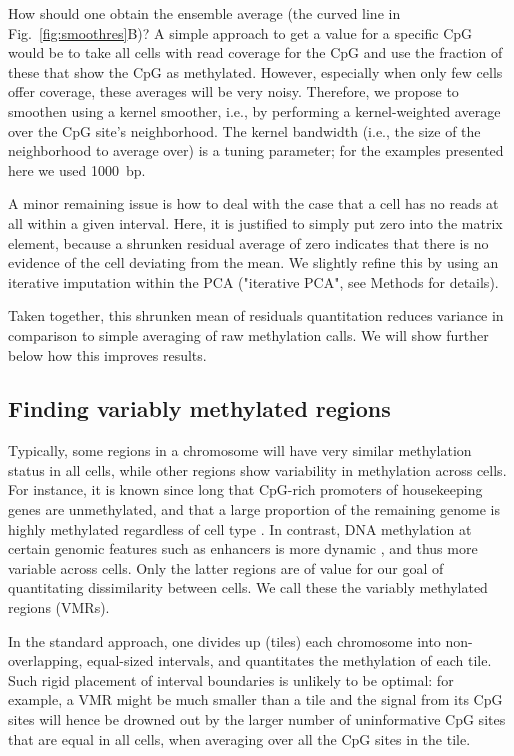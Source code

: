\documentclass[10pt]{article}
\begin{document}
How should one obtain the ensemble average (the curved line in Fig.~\ref{fig:smoothres}B)?
A simple approach to get a value for a specific CpG would be to take all cells with read coverage for the CpG and use the fraction of these that show the CpG as methylated.
However, especially when only few cells offer coverage, these averages will be very noisy.
Therefore, we propose to smoothen using a kernel smoother, i.e., by performing a kernel-weighted average over the CpG site's neighborhood.
The kernel bandwidth (i.e., the size of the neighborhood to average over) is a tuning parameter; for the examples presented here we used 1000~bp.

A minor remaining issue is how to deal with the case that a cell has no reads at all within a given interval.
Here, it is justified to simply put zero into the matrix element, because a shrunken residual average of zero indicates that there is no evidence of the cell deviating from the mean.
We slightly refine this by using an iterative imputation within the PCA ("iterative PCA", see Methods for details).

Taken together, this shrunken mean of residuals quantitation reduces variance in comparison to simple averaging of raw methylation calls.
We will show further below how this improves results.

\subsection*{Finding variably methylated regions}


Typically, some regions in a chromosome will have very similar methylation status in all cells, while other regions show variability in methylation across cells.
For instance, it is known  since long that CpG-rich promoters of housekeeping genes are unmethylated, and that a large proportion of the remaining genome is highly methylated regardless of cell type \citep{bird1986cpg}.
In contrast, DNA methylation at certain genomic features such as enhancers is more dynamic \citep[e.g.,][]{argelaguet2019gastru}, and thus more variable across cells.
Only the latter regions are of value for our goal of quantitating dissimilarity between cells.
We call these the variably methylated regions (VMRs).

In the standard approach, one divides up (tiles) each chromosome into non-overlapping, equal-sized intervals, and quantitates the methylation of each tile.
Such rigid placement of interval boundaries is unlikely to be optimal: for example, a VMR might be much smaller than a tile and the signal from its CpG sites will hence be drowned out by the larger number of uninformative CpG sites that are equal in all cells, when averaging over all the CpG sites in the tile.
\end{document}

